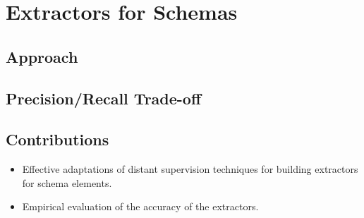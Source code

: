 \section{Extractors for Schemas}

\subsection{Approach}

\subsection{Precision/Recall Trade-off}

\subsection{Contributions}

\begin{itemize}
\item Effective adaptations of distant supervision techniques for building extractors for schema elements.
\item Empirical evaluation of the accuracy of the extractors. 
\end{itemize}

